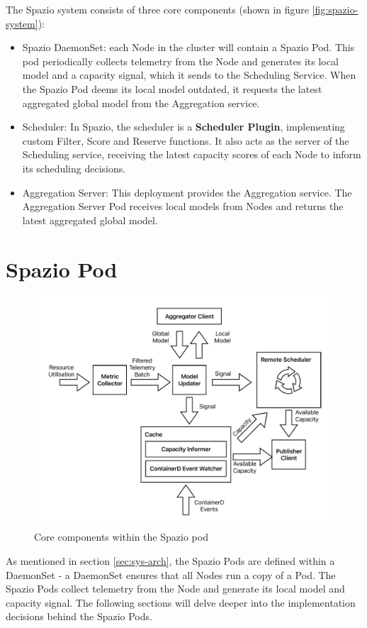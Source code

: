 The Spazio system consists of three core components (shown in figure
\ref{fig:spazio-system}):
\begin{itemize}
    \item Spazio DaemonSet: each Node in the cluster will contain a Spazio Pod.
        This pod periodically collects telemetry from the Node and generates its
        local model and a capacity signal, which it sends to the Scheduling
        Service. When the Spazio Pod deems its local model outdated, it requests
        the latest aggregated global model from the Aggregation service.
    \item Scheduler: In Spazio, the scheduler is a \textbf{Scheduler Plugin},
        implementing custom Filter, Score and Reserve functions. It also acts as
        the server of the Scheduling service, receiving the latest capacity
        scores of each Node to inform its scheduling decisions.
    \item Aggregation Server: This deployment provides the Aggregation service.
        The Aggregation Server Pod receives local models from Nodes
        and returns the latest aggregated global model.
\end{itemize}

\section{Spazio Pod}
\begin{figure}[H]
    \centering
    \includegraphics[width=\textwidth]{images/pronto-pod.pdf}
    \caption{Core components within the Spazio pod}
    \label{spazio-pod-components}
\end{figure}
As mentioned in section \ref{sec:sys-arch}, the Spazio Pods are defined within a
DaemonSet - a DaemonSet ensures that all Nodes run a copy of a Pod. The Spazio
Pods collect telemetry from the Node and generate its local model and capacity
signal. The following sections will delve deeper into the implementation
decisions behind the Spazio Pods.


